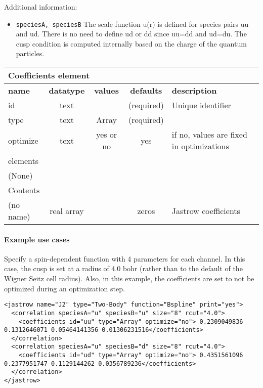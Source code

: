 \FloatBarrier

Additional information:
\begin{itemize}
\item \texttt{speciesA, speciesB} The scale function u(r) is defined for species pairs uu and ud.  
There is no need to define ud or dd since uu=dd and ud=du.  The cusp condition is computed internally 
based on the charge of the quantum particles.
\end{itemize}

\begin{table}[h]
\begin{center}
\begin{tabular}{l c c c l }
\hline
\multicolumn{5}{l}{Coefficients element} \\
\hline
\bfseries name & \bfseries datatype & \bfseries values & \bfseries defaults & \bfseries description \\
\hline
id & text & & (required) & Unique identifier \\
type & text & Array & (required) & \\
optimize & text & yes or no & yes & if no, values are fixed in optimizations \\
\hline
\multicolumn{5}{l}{elements}\\ \hline
(None) & & & \\ \hline
\multicolumn{5}{l}{Contents}\\ \hline
 (no name) & real array & & zeros & Jastrow coefficients \\ \hline
\end{tabular}
\end{center}
\end{table}

\paragraph{Example use cases}
\label{sec:2bjsplineexamples}

Specify a spin-dependent function with 4 parameters for each channel.  In this case, the cusp is set at 
a radius of 4.0 bohr (rather than to the default of the Wigner Seitz cell radius).  Also, in this example,
the coefficients are set to not be optimized during an optimization step.

\begin{lstlisting}
<jastrow name="J2" type="Two-Body" function="Bspline" print="yes">
  <correlation speciesA="u" speciesB="u" size="8" rcut="4.0">
    <coefficients id="uu" type="Array" optimize="no"> 0.2309049836 0.1312646071 0.05464141356 0.01306231516</coefficients>
  </correlation>
  <correlation speciesA="u" speciesB="d" size="8" rcut="4.0">
    <coefficients id="ud" type="Array" optimize="no"> 0.4351561096 0.2377951747 0.1129144262 0.0356789236</coefficients>
  </correlation>
</jastrow>
\end{lstlisting}
